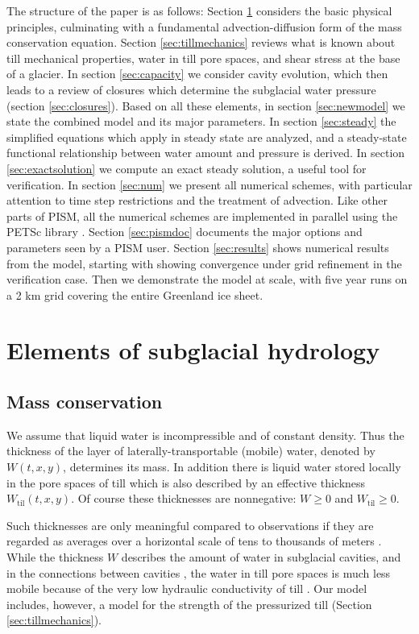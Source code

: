 \documentclass[gmd]{copernicus}   %
\newcommand{\text}{\textrm}
\newcommand{\Wtil}{W_{\text{til}}}
\begin{document}
The structure of the paper is as follows: Section \ref{sec:elements} considers the basic physical principles, culminating with a fundamental advection-diffusion form of the mass conservation equation.  Section \ref{sec:tillmechanics} reviews what is known about till mechanical properties, water in till pore spaces, and shear stress at the base of a glacier.  In section \ref{sec:capacity} we consider cavity evolution, which then leads to a review of closures which determine the subglacial water pressure (section \ref{sec:closures}).  Based on all these elements, in section \ref{sec:newmodel} we state the combined model and its major parameters.  In section \ref{sec:steady} the simplified equations which apply in steady state are analyzed, and a steady-state functional relationship between water amount and pressure is derived.  In section \ref{sec:exactsolution} we compute an exact steady solution, a useful tool for verification.  In section \ref{sec:num} we present all numerical schemes, with particular attention to time step restrictions and the treatment of advection.  Like other parts of PISM, all the numerical schemes are implemented in parallel using the PETSc library \citep{petsc-user-ref}.  Section \ref{sec:pismdoc} documents the major options and parameters seen by a PISM user.  Section \ref{sec:results} shows numerical results from the model, starting with showing convergence under grid refinement in the verification case.  Then we demonstrate the model at scale, with five year runs on a 2 km grid covering the entire Greenland ice sheet.


\section{Elements of subglacial hydrology} \label{sec:elements}

\subsection{Mass conservation}  We assume that liquid water is incompressible and of constant density.  Thus the thickness of the layer of laterally-transportable (mobile) water, denoted by $W(t,x,y)$, determines its mass.  In addition there is liquid water stored locally in the pore spaces of till \citep{Tulaczyketal2000b} which is also described by an effective thickness $\Wtil(t,x,y)$.  Of course these thicknesses are nonnegative: $W \ge 0$ and $\Wtil \ge 0$.

Such thicknesses are only meaningful compared to observations if they are regarded as averages over a horizontal scale of tens to thousands of meters \citep{FlowersClarke2002_theory}.  While the thickness $W$ describes the amount of water in subglacial cavities, and in the connections between cavities \citep{Kamb1987}, the water in till pore spaces is much less mobile because of the very low hydraulic conductivity of till \citep{LingleBrown1987,Tulaczyketal2000,TrufferEchelmeyerHarrison2001}.  Our model includes, however, a model for the strength of the pressurized till (Section \ref{sec:tillmechanics}).
\end{document}
